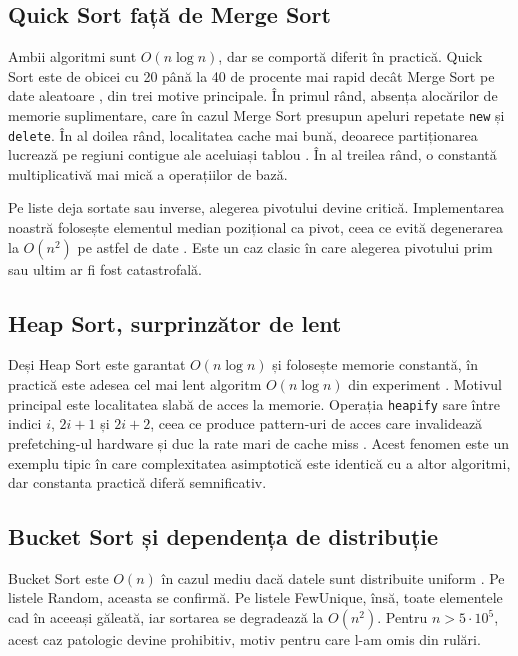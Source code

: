 \documentclass[12pt, a4paper]{article}
\begin{document}
\subsection{Quick Sort față de Merge Sort}

Ambii algoritmi sunt $O(n \log n)$, dar se comportă diferit în practică.
Quick Sort este de obicei cu 20 până la 40 de procente mai rapid decât
Merge Sort pe date aleatoare \citep{sedgewick2011, mcilroy1993}, din trei
motive principale. În primul rând, absența alocărilor de memorie
suplimentare, care în cazul Merge Sort presupun apeluri repetate
\texttt{new} și \texttt{delete}. În al doilea rând, localitatea cache mai
bună, deoarece partiționarea lucrează pe regiuni contigue ale aceluiași
tablou \citep{lamarca1999}. În al treilea rând, o constantă multiplicativă
mai mică a operațiilor de bază.

Pe liste deja sortate sau inverse, alegerea pivotului devine critică.
Implementarea noastră folosește elementul median pozițional ca pivot, ceea
ce evită degenerarea la $O(n^2)$ pe astfel de date \citep{mcilroy1993}.
Este un caz clasic în care alegerea pivotului prim sau ultim ar fi fost
catastrofală.

\subsection{Heap Sort, surprinzător de lent}

Deși Heap Sort este garantat $O(n \log n)$ și folosește memorie constantă,
în practică este adesea cel mai lent algoritm $O(n \log n)$ din experiment
\citep{lamarca1999}. Motivul principal este localitatea slabă de acces la
memorie. Operația \texttt{heapify} sare între indici $i$, $2i+1$ și
$2i+2$, ceea ce produce pattern-uri de acces care invalidează
prefetching-ul hardware \citep{drepper2007} și duc la rate mari de cache
miss \citep{xiao2000}. Acest fenomen este un exemplu tipic în care
complexitatea asimptotică este identică cu a altor algoritmi, dar
constanta practică diferă semnificativ.

\subsection{Bucket Sort și dependența de distribuție}

Bucket Sort este $O(n)$ în cazul mediu dacă datele sunt distribuite
uniform \citep{cormen2009}. Pe listele Random, aceasta se confirmă. Pe
listele FewUnique, însă, toate elementele cad în aceeași găleată, iar
sortarea se degradează la $O(n^2)$. Pentru $n > 5 \cdot 10^5$, acest caz
patologic devine prohibitiv, motiv pentru care l-am omis din rulări.
\end{document}
